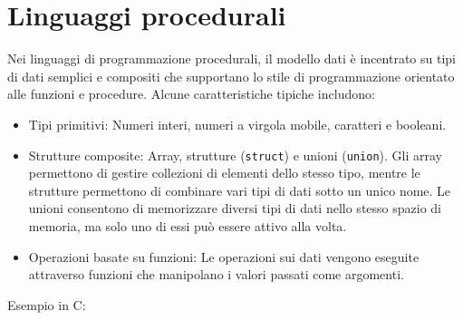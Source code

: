 \documentclass[
  letterpaper,
]{scrbook}
\begin{document}
\section{Linguaggi procedurali}\label{linguaggi-procedurali}

Nei linguaggi di programmazione procedurali, il modello dati è
incentrato su tipi di dati semplici e compositi che supportano lo stile
di programmazione orientato alle funzioni e procedure. Alcune
caratteristiche tipiche includono:

\begin{itemize}
\item
  Tipi primitivi: Numeri interi, numeri a virgola mobile, caratteri e
  booleani.
\item
  Strutture composite: Array, strutture (\texttt{struct}) e unioni
  (\texttt{union}). Gli array permettono di gestire collezioni di
  elementi dello stesso tipo, mentre le strutture permettono di
  combinare vari tipi di dati sotto un unico nome. Le unioni consentono
  di memorizzare diversi tipi di dati nello stesso spazio di memoria, ma
  solo uno di essi può essere attivo alla volta.
\item
  Operazioni basate su funzioni: Le operazioni sui dati vengono eseguite
  attraverso funzioni che manipolano i valori passati come argomenti.
\end{itemize}

Esempio in C:
\end{document}
